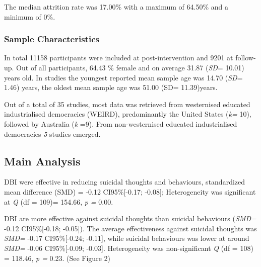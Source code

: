\documentclass[
  english,
  man]{apa6}
\begin{document}
The median attrition rate was 17.00\% with a maximum of 64.50\% and a minimum of 0\%.

\hypertarget{sample-characteristics}{%
\subsubsection{Sample Characteristics}\label{sample-characteristics}}

In total 11158 participants were included at post-intervention and 9201 at follow-up. Out of all participants, 64.43 \% female and on average 31.87 (\emph{SD}= 10.01) years old. In studies the youngest reported mean sample age was 14.70 (\emph{SD}= 1.46) years, the oldest mean sample age was 51.00 (SD= 11.39)years.

Out of a total of 35 studies, most data was retrieved from westernised educated industrialised democracies (WEIRD), predominantly the United States (\emph{k=} 10), followed by Australia (\emph{k} =9). From non-westernised educated industrialised democracies \emph{5} studies emerged.

\hypertarget{main-analysis}{%
\subsection{Main Analysis}\label{main-analysis}}

DBI were effective in reducing suicidal thoughts and behaviours, standardized mean difference (SMD) = -0.12 CI95\%{[}-0.17; -0.08{]}; Heterogeneity was significant at \emph{Q} (df = 109)= 154.66, \emph{p =} 0.00.

DBI are more effective against suicidal thoughts than suicidal behaviours (\emph{SMD=} -0.12 CI95\%{[}-0.18; -0.05{]}). The average effectiveness against suicidal thoughts was \emph{SMD=} -0.17 CI95\%{[}-0.24; -0.11{]}, while suicidal behaviours was lower at around \emph{SMD=} -0.06 CI95\%{[}-0.09; -0.03{]}. Heterogeneity was non-significant \emph{Q} (df = 108) = 118.46, \emph{p =} 0.23. (See Figure 2)
\end{document}
